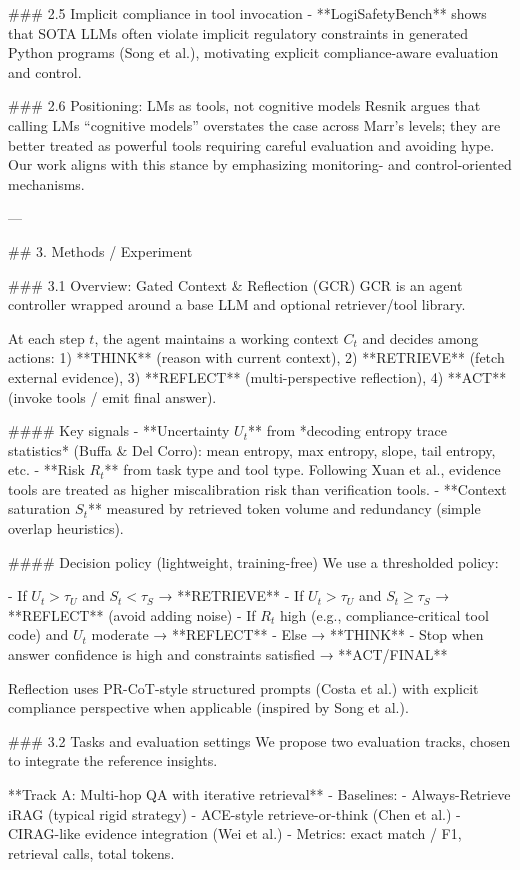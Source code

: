 ### 2.5 Implicit compliance in tool invocation  
- **LogiSafetyBench** shows that SOTA LLMs often violate implicit regulatory constraints in generated Python programs (Song et al.), motivating explicit compliance-aware evaluation and control.

### 2.6 Positioning: LMs as tools, not cognitive models  
Resnik argues that calling LMs “cognitive models” overstates the case across Marr’s levels; they are better treated as powerful tools requiring careful evaluation and avoiding hype. Our work aligns with this stance by emphasizing monitoring- and control-oriented mechanisms.

---

## 3. Methods / Experiment  

### 3.1 Overview: Gated Context & Reflection (GCR)  
GCR is an agent controller wrapped around a base LLM and optional retriever/tool library.

At each step \(t\), the agent maintains a working context \(C_t\) and decides among actions:  
1) **THINK** (reason with current context),  
2) **RETRIEVE** (fetch external evidence),  
3) **REFLECT** (multi-perspective reflection),  
4) **ACT** (invoke tools / emit final answer).

#### Key signals  
- **Uncertainty \(U_t\)** from *decoding entropy trace statistics* (Buffa & Del Corro): mean entropy, max entropy, slope, tail entropy, etc.  
- **Risk \(R_t\)** from task type and tool type. Following Xuan et al., evidence tools are treated as higher miscalibration risk than verification tools.  
- **Context saturation \(S_t\)** measured by retrieved token volume and redundancy (simple overlap heuristics).

#### Decision policy (lightweight, training-free)  
We use a thresholded policy:

- If \(U_t > \tau_U\) and \(S_t < \tau_S\) → **RETRIEVE**  
- If \(U_t > \tau_U\) and \(S_t \ge \tau_S\) → **REFLECT** (avoid adding noise)  
- If \(R_t\) high (e.g., compliance-critical tool code) and \(U_t\) moderate → **REFLECT**  
- Else → **THINK**  
- Stop when answer confidence is high and constraints satisfied → **ACT/FINAL**

Reflection uses PR-CoT-style structured prompts (Costa et al.) with explicit compliance perspective when applicable (inspired by Song et al.).

### 3.2 Tasks and evaluation settings  
We propose two evaluation tracks, chosen to integrate the reference insights.

**Track A: Multi-hop QA with iterative retrieval**  
- Baselines:  
  - Always-Retrieve iRAG (typical rigid strategy)  
  - ACE-style retrieve-or-think (Chen et al.)  
  - CIRAG-like evidence integration (Wei et al.)  
- Metrics: exact match / F1, retrieval calls, total tokens.

